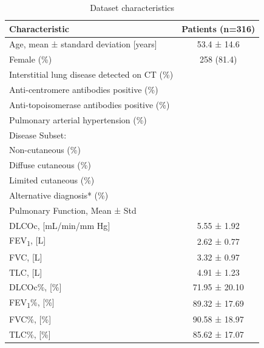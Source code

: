 \begin{table}[tb]
\centering
\caption{Dataset characteristics}
\begin{tabular}{lc}
\hline
Characteristic                                & Patients   (n=316) \\ \hline
Age, mean  ±  standard deviation {[}years{]}    & 53.4 ± 14.6        \\
Female (\%)                                   & 258 (81.4)         \\
Interstitial lung disease detected on CT (\%) &                    \\
Anti-centromere antibodies positive (\%)      &                    \\
Anti-topoisomerase antibodies positive (\%)   &                    \\
Pulmonary arterial hypertension (\%)          &                    \\
Disease Subset:                               &                    \\
\quad Non-cutaneous (\%)                            &                    \\
\quad Diffuse cutaneous (\%)                        &                    \\
\quad Limited cutaneous (\%)                        &                    \\
\quad Alternative diagnosis* (\%)                   &                    \\
Pulmonary Function, Mean ± Std                &                    \\
\quad DLCOc, {[}mL/min/mm Hg{]}                    & 5.55 ± 1.92        \\
\quad FEV\textsubscript{1}, {[}L{]}                                 & 2.62 ± 0.77        \\
\quad FVC, {[}L{]}                                  & 3.32 ± 0.97        \\
\quad TLC, {[}L{]}                                  & 4.91 ± 1.23        \\
\quad DLCOc\%, {[}\%{]}                            & 71.95 ± 20.10      \\
\quad FEV\textsubscript{1}\%, {[}\%{]}                             & 89.32 ± 17.69      \\
\quad FVC\%, {[}\%{]}                              & 90.58 ± 18.97      \\
\quad TLC\%, {[}\%{]}                              & 85.62 ± 17.07     \\ \hline
\end{tabular}
\label{chap4_table: dataset}
\end{table}




